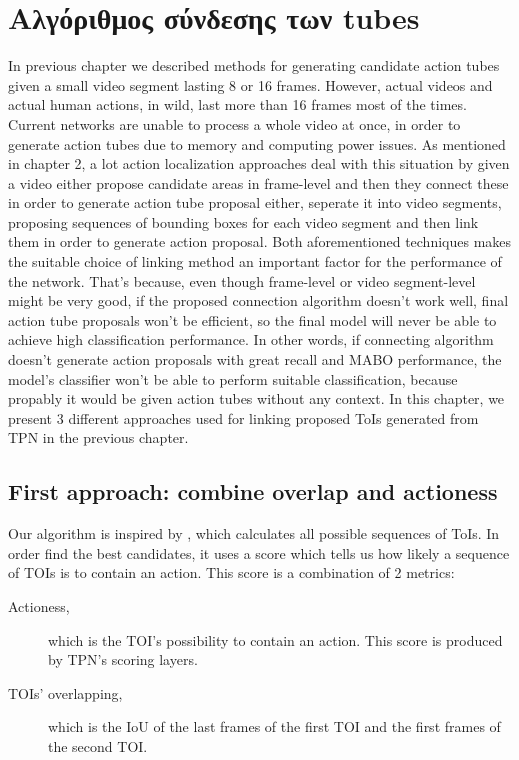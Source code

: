 \documentclass{report}
\begin{document}
 
\chapter{Αλγόριθμος σύνδεσης των tubes}

In previous chapter we described methods for generating candidate action tubes given a small video segment lasting 8 or 16 frames. However, actual videos
and actual human actions, in wild, last more than 16 frames most of the times. Current networks are unable to process a whole video at once, in order to generate action tubes
due to memory and computing power issues.  As mentioned in chapter 2, a lot action localization approaches deal with this situation by given a video either
propose candidate areas in frame-level and then they connect these in order to generate action tube proposal either, seperate it into video segments,
proposing  sequences of bounding boxes for each video segment and then link them in order to generate action proposal. Both aforementioned techniques makes
the suitable choice of linking method an important factor for the performance of the network. That's because, even though frame-level or video segment-level
might be very good, if the proposed connection algorithm doesn't work well, final action tube proposals won't be efficient, so the final model will never
be able to achieve high classification performance. In other words, if connecting algorithm doesn't generate action proposals with great recall and MABO performance,
the model's classifier won't be able to perform suitable classification, because propably it would be given action tubes without any context.
In this chapter, we present 3 different approaches used for linking proposed ToIs generated from TPN in the previous chapter.

\section{First approach: combine overlap and actioness}
Our algorithm is inspired by \cite{DBLP:journals/corr/HouCS17}, which calculates all possible sequences of ToIs. In order find the best candidates,
it uses a score which tells us how likely a sequence of TOIs is  to contain an action. This score is a combination of 2 metrics:
\begin{description}
\item[ Actioness,  ] which is the TOI's possibility to contain an action. This score is produced by TPN's scoring layers.
\item [ TOIs' overlapping, ] which is the IoU of the last frames of the first TOI and the first frames of the second TOI.
\end{description}
\end{document}
